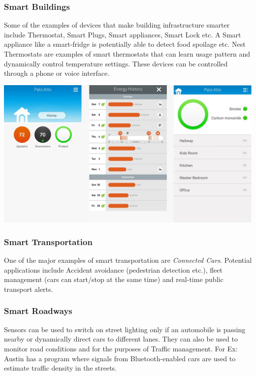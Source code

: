 \documentclass[twoside]{article}
\begin{document}
\subsubsection{Smart Buildings}
Some of the examples of devices that make building infrastructure smarter include Thermostat, Smart Plugs, Smart appliances, Smart Lock etc.
A Smart appliance like a smart-fridge is potentially able to detect food spoilage etc. Nest Thermostats are examples of smart thermostats that can learn usage pattern and dynamically control temperature settings. These devices can be controlled through a phone or voice interface.
\begin{center}
    \includegraphics[scale=0.5]{nest-thermostat.jpeg}
\end{center}

\subsubsection{Smart Transportation}
One of the major examples of smart transportation are \textit{Connected Cars}. Potential applications include Accident avoidance (pedestrian detection etc.), fleet management (cars can start/stop at the same time) and real-time public transport alerts.

\subsubsection{Smart Roadways}
Sensors can be used to switch on street lighting only if an automobile is passing nearby or dynamically direct cars to different lanes. They can also be used to monitor road conditions and for the purposes of Traffic management. For Ex: Austin has a program where signals from Bluetooth-enabled cars are used to estimate traffic density in the streets.
\end{document}
